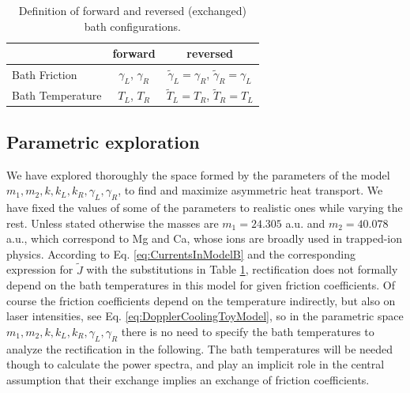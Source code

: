 
\begin{table}[]
\center
\caption{Definition of forward and reversed (exchanged) bath configurations.}
\begin{tabular}{lcc}
\hline
                 & forward                & reversed                                                       \\ \hline
Bath Friction    & $\gamma_L$, $\gamma_R$ & $\tilde{\gamma}_L =\gamma_R $,  $\tilde{\gamma}_R =\gamma_L $   \\
Bath Temperature & $T_L$, $T_R$           & $\tilde{T}_L =T_R $,  $\tilde{T}_R =T_L $                     \\
\hline
\end{tabular}
\label{tab:reversed_bath}
\end{table}
%
%
\subsection{Parametric exploration}
%
%
%
We have explored thoroughly the space formed by the parameters of the model $m_1,m_2,k,k_L,k_R,\gamma_L,\gamma_R$, to find
and maximize asymmetric heat transport. We have fixed the values of some of the parameters to realistic ones while varying the rest. Unless stated otherwise the masses are
$m_1 = 24.305$ a.u. and $m_2 = 40.078$ a.u., which correspond to Mg and Ca, whose ions are broadly used in trapped-ion physics. According to Eq. \eqref{eq:CurrentsInModelB} and the corresponding expression for $\tilde{J}$ with the substitutions in Table \ref{tab:reversed_bath},
rectification does not formally depend on the bath temperatures in this model for given friction coefficients.
Of course the friction coefficients depend on the temperature indirectly, but also on laser intensities, see Eq. \eqref{eq:DopplerCoolingToyModel}, so in the parametric space $m_1,m_2,k,k_L,k_R,\gamma_L,\gamma_R$ there is no need to specify the bath temperatures to analyze the rectification in the following. The bath temperatures will be needed though
to calculate the power spectra, and play an implicit role in the central assumption that their exchange implies an exchange of
friction coefficients.


